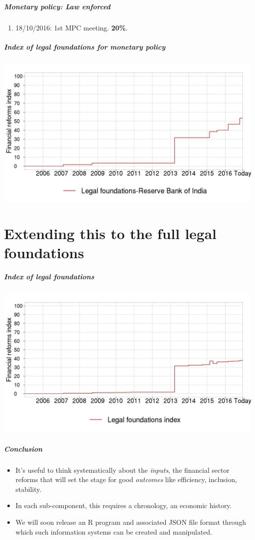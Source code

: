 \documentclass{beamer}
\newcommand{\fullpage}[1]{
\part{#1}
\begin{frame}
  \partpage
\end{frame}
}
\begin{document}
\begin{frame}
  \frametitle{Monetary policy: Law enforced}
  \begin{enumerate}
  \item 18/10/2016: 1st MPC meeting. \textbf{20\%}.
  \end{enumerate}
\end{frame}

\begin{frame}
  \frametitle{Index of legal foundations for monetary policy}
  \includegraphics[width=\linewidth]{../GRAPHS/frm_index_legal_foundations_reserve_bank_of_india.png}
\end{frame}

\fullpage{Extending this to the full legal foundations}

\begin{frame}
  \frametitle{Index of legal foundations}
  \includegraphics[width=\linewidth]{../GRAPHS/frm_index_legal_foundations.png}
\end{frame}

\begin{frame}
  \frametitle{Conclusion}
  \begin{itemize}
  \item It's useful to think systematically about the \textit{inputs},
    the financial sector reforms that will set the stage for good
    \textit{outcomes} like efficiency, inclusion, stability.
  \item In each sub-component, this requires a chronology, an economic
    history.
  \item We will soon release an R program and associated JSON file
    format through which such information systems can be created and
    manipulated.
  \end{itemize}
\end{frame}
\end{document}
